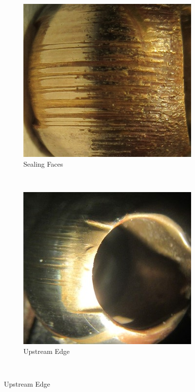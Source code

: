 \documentclass[]{article}
\begin{document}
\begin{figure}
	\centering
	\begin{subfigure}[h]{0.4\textwidth}
		\includegraphics[width=\textwidth]{Photos/ball_seal_faces}
		\caption{Sealing Faces}
		\label{fig:sealingFaces}
	\end{subfigure}
	~ %
	\begin{subfigure}[h]{0.4\textwidth}
		\includegraphics[width=\textwidth]{Photos/ball_upstream_face}
		\caption{Upstream Edge}
		\label{fig:upstream edge}
	\end{subfigure}
	~ %
	

\end{figure}
\end{document}
